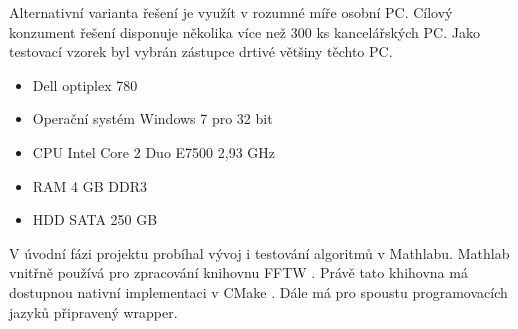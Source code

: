 Alternativní varianta řešení je využít v rozumné míře osobní PC. Cílový konzument řešení disponuje několika více než 300 ks kancelářských PC. Jako testovací vzorek byl vybrán zástupce drtivé většiny těchto PC.
\begin{itemize}
	\setlength{\parskip}{0pt}
	\setlength{\itemsep}{0pt}
	\item {Dell optiplex 780}
	\item {Operační systém Windows 7 pro 32 bit}
	\item {CPU Intel Core 2 Duo E7500 2,93 GHz}
	\item {RAM 4 GB DDR3}
	\item {HDD SATA 250 GB}
\end{itemize}

V úvodní fázi projektu probíhal vývoj i testování algoritmů v Mathlabu. Mathlab vnitřně používá pro zpracování knihovnu FFTW \cite{fftw}. Právě tato khihovna má dostupnou nativní implementaci v CMake \cite{cmake}. Dále má pro spoustu programovacích jazyků připravený wrapper.

